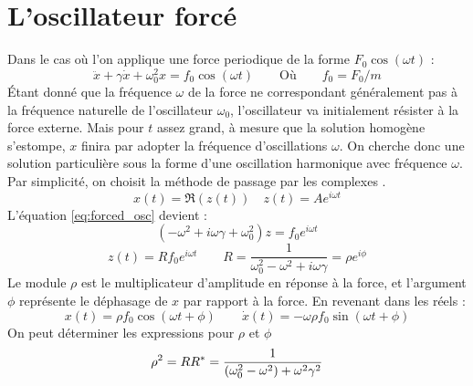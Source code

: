 \section{L'oscillateur forcé}
%
Dans le cas où l’on applique une force periodique de la forme $F_0\cos(\omega t)$ :
%
\begin{equation}
    \ddot{x} + \gamma\dot{x} + \omega_0^2 x = f_0\cos(\omega t)
    \qquad
    \text{Où}
    \qquad
    f_0 = F_0/m
    \label{eq:forced_osc}
\end{equation}
%
Étant donné que la fréquence $\omega$ de la force ne correspondant 
généralement pas à la fréquence naturelle de l'oscillateur $\omega_0$, 
l'oscillateur va initialement résister à la force externe.
Mais pour $t$ assez grand, à mesure que la solution homogène s'estompe, $x$ finira par adopter la fréquence d'oscillations $\omega$. 
On cherche donc une solution particulière 
sous la forme d'une oscillation harmonique avec fréquence $\omega$. 
Par simplicité, on choisit la méthode de passage par les complexes \cite{feynman_feynman_nodate}.
%
\begin{equation}
    x(t) = \Re(z(t)) \quad z(t) = Ae^{i\omega t}
\end{equation}
%
L'équation \eqref{eq:forced_osc} devient :
%
\begin{equation}
    (-\omega^2 + i\omega\gamma + \omega_0^2)z = f_0 e^{i\omega t}
\end{equation}
%
\begin{equation}
    z(t) = R f_0 e^{i \omega t} \qquad R = \frac{1}{\omega_0^2 - \omega^2 + i\omega\gamma} = \rho e^{i\phi}
\end{equation}
%
Le module $\rho$ est le multiplicateur d’amplitude en réponse à la force, et l’argument $\phi$ représente le déphasage de $x$ par rapport à la force.
%
En revenant dans les réels :
\begin{equation}
    x(t) = \rho f_0 \cos(\omega t + \phi)
    \qquad \dot{x}(t) = -\omega \rho f_0 \sin(\omega t + \phi)
\end{equation}
%
On peut déterminer les expressions pour $\rho$ et $\phi$
%
\begin{dmath}
    \rho^2 = RR^* \\
    = \frac{1}{(\omega_0^2 - \omega^2) + \omega^2\gamma^2}
\end{dmath}

